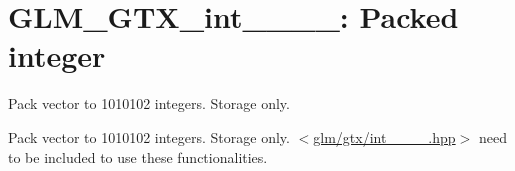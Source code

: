 \hypertarget{group__gtx__int__10__10__10__2}{\section{\-G\-L\-M\-\_\-\-G\-T\-X\-\_\-int\-\_\-\_\-\_\-\_\-: \-Packed integer}
\label{group__gtx__int__10__10__10__2}
}


\-Pack vector to 1010102 integers. \-Storage only.  


\-Pack vector to 1010102 integers. \-Storage only. $<$\hyperlink{int__10__10__10__2_8hpp}{glm/gtx/int\-\_\-\_\-\_\-\_.\-hpp}$>$ need to be included to use these functionalities. 
